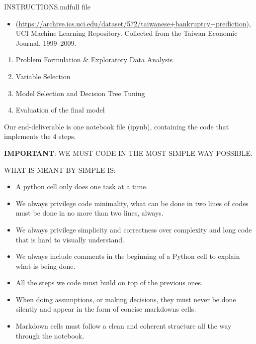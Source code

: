 \begin{mdfile}{INSTRUCTIONS.md}{full file}

\begin{itemize}
\tightlist
\item
  (\url{https://archive.ics.uci.edu/dataset/572/taiwanese+bankruptcy+prediction}), UCI Machine Learning Repository. Collected from the Taiwan Economic Journal, 1999--2009.
\end{itemize}


\begin{enumerate}
\def\labelenumi{\arabic{enumi}.}
\tightlist
\item
  Problem Formulation \& Exploratory Data Analysis
\item
  Variable Selection
\item
  Model Selection and Decision Tree Tuning
\item
  Evaluation of the final model
\end{enumerate}

Our end-deliverable is one notebook file (ipynb), containing the code that implements the 4 steps.

\textbf{IMPORTANT}: WE MUST CODE IN THE MOST SIMPLE WAY POSSIBLE.

WHAT IS MEANT BY SIMPLE IS:

\begin{itemize}
\tightlist
\item
  A python cell only does one task at a time.
\item
  We always privilege code minimality, what can be done in two lines of codes must be done in no more than two lines, always.
\item
  We always privilege simplicity and correctness over complexity and long code that is hard to visually understand.
\item
  We always include comments in the beginning of a Python cell to explain what is being done.
\item
  All the steps we code must build on top of the previous ones.
\item
  When doing assumptions, or making decisions, they must never be done silently and appear in the form of concise markdowns cells.
\item
  Markdown cells must follow a clean and coherent structure all the way through the notebook.
\end{itemize}


\end{mdfile}
